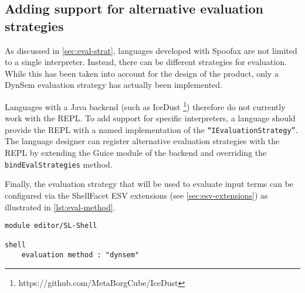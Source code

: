 \subsection{Adding support for alternative evaluation strategies}
\label{ssec:discuss-alternate-eval}

As discussed in \cref{sec:eval-strat}, languages developed with Spoofax are not
limited to a single interpreter. Instead, there can be different strategies for
evaluation. While this has been taken into account for the design of the
product, only a DynSem evaluation strategy has actually been implemented.

Languages with a Java backend (such as IceDust%
\footnote{https://github.com/MetaBorgCube/IceDust}) therefore do not currently
work with the REPL. To add support for specific interpreters, a language should
provide the REPL with a named implementation of the
\texttt{``IEvaluationStrategy''}. The language designer can register alternative
evaluation strategies with the REPL by extending the Guice module of the backend
and overriding the \texttt{bindEvalStrategies} method.

Finally, the evaluation strategy that will be used to evaluate input terms can
be configured via the ShellFacet ESV extensions (see \cref{sec:esv-extensions})
as illustrated in \cref{lst:eval-method}.

\begin{lstlisting}[language=esv,caption={Setting the evaluation strategy.},label={lst:eval-method}]
module editor/SL-Shell

shell
    evaluation method : "dynsem"
\end{lstlisting}

